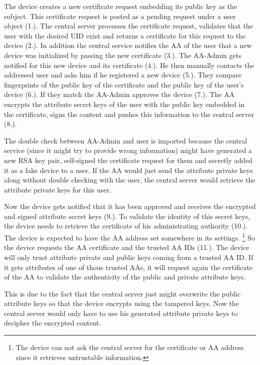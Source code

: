 The device creates a new certificate request embedding its public key as the subject. This certificate request is posted as a pending request under a user object (1.). The central server processes the certificate request, validates that the user with the desired UID exist and returns a certificate for this request to the device (2.). In addition the central service notifies the AA of the user that a new device was initialized by passing the new certificate (3.). The AA-Admin gets notified for this new device and its certificate (4.). He then manually contacts the addressed user and asks him if he registered a new device (5.). They compare fingerprints of the public key of the certificate and the public key of the user’s device (6.). If they match the AA-Admin approves the device (7.). The AA encrypts the attribute secret keys of the user with the public key embedded in the certificate, signs the content and pushes this information to the central server (8.). 

The double check between AA-Admin and user is imported because the central service (since it might try to provide wrong information) might have generated a new RSA key pair, self-signed the certificate request for them and secretly added it as a fake device to a user. If the AA would just send the attribute private keys along without double checking with the user, the central server would retrieve the attribute private keys for this user. 

Now the device gets notified that it has been approved and receives the encrypted and signed attribute secret keys (9.). To validate the identity of this secret keys, the device needs to retrieve the certificate of his administrating authority (10.). The device is expected to have the AA address set somewhere in its settings. \footnote{The device can not ask the central server for the certificate or AA address since it retrieves untrustable information.} So the device requests the AA certificate and the trusted AA IDs (11.). The device will only trust attribute private and public keys coming from a trusted AA ID. If it gets attributes of one of thous trusted AAs, it will request again the certificate of the AA to validate the authenticity of the public and private attribute keys. 

This is due to the fact that the central server just might overwrite the public attribute keys so that the device encrypts using the tampered keys. Now the central server would only have to use his generated attribute private keys to decipher the encrypted content. 

